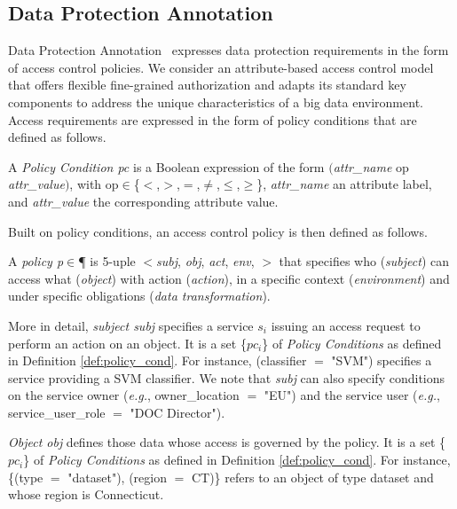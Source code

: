       \subsection{Data Protection Annotation}\label{sec:nonfuncannotation}
      Data Protection Annotation \myLambda\ expresses data protection requirements in the form of access control policies. We consider an attribute-based access control model that offers flexible fine-grained authorization and adapts its standard key components to address the unique characteristics of a big data environment. Access requirements are expressed in the form of policy conditions that are defined as follows.

      \begin{definition}\label{def:policy_cond}
        A \emph{Policy Condition pc} is a Boolean expression of the form $($\emph{attr\_name} op \emph{attr\_value}$)$, with op$\in$\{$<$,$>$,$=$,$\neq$,$\leq$,$\geq$\}, \emph{attr\_name} an attribute label, and \emph{attr\_value} the corresponding attribute value.
      \end{definition}

      Built on policy conditions, an access control policy is then defined as follows.

      \begin{definition}[Policy]\label{def:policy_rule}
        A {\it policy p}$\in$\P{} is 5-uple $<$\textit{subj}, \textit{obj}, \textit{act}, \textit{env}, \textit{\TP}$>$ that specifies who (\emph{subject}) can access what (\emph{object}) with action (\emph{action}), in a specific context (\emph{environment}) and under specific obligations (\emph{data transformation}).
      \end{definition}

      More in detail, \textit{subject subj} specifies a service $s_i$ issuing an access request to perform an action on an object. It is a set \{$pc_i$\} of \emph{Policy Conditions} as defined in Definition \ref{def:policy_cond}. For instance, (classifier $=$ "SVM") specifies a service providing a SVM classifier. We note that \textit{subj} can also specify conditions on the service owner (\textit{e.g.}, owner\_location $=$ "EU") and the service user (\textit{e.g.}, service\_user\_role $=$ "DOC Director").

      \textit{Object obj} defines those data whose access is governed by the policy. It is a set \{$pc_i$\} of \emph{Policy Conditions} as defined in Definition \ref{def:policy_cond}.
      For instance, \{(type $=$ "dataset"), (region $=$ CT)\} refers to an object of type dataset and whose region is Connecticut.

